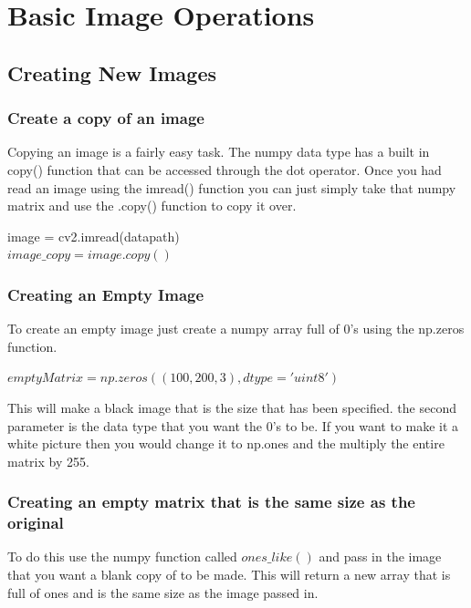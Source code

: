 \documentclass[fleqn]{article}
\begin{document}
      \newpage

      \section{Basic Image Operations}

      \subsection{Creating New Images}
      \subsubsection{Create a copy of an image}
      Copying an image is a fairly easy task. The numpy data type has a built in copy() function that can be accessed through the dot operator. Once you had read an image using the imread() function you can just simply take that numpy matrix and use the .copy() function to copy it over.

      \begin{center}
        image = cv2.imread(datapath)\\
        $image\_copy = image.copy()$
      \end{center}

      \subsubsection{Creating an Empty Image}
      To create an empty image just create a numpy array full of 0's using the np.zeros function.

      \begin{center}
        $emptyMatrix = np.zeros((100,200,3),dtype='uint8')$\\
      \end{center}
              This will make a black image that is the size that has been specified. the second parameter is the data type that you want the 0's to be. If you want to make it a white picture then you would change it to np.ones and the multiply the entire matrix by 255.

      \subsubsection{Creating an empty matrix that is the same size as the original}
      To do this use the numpy function called $ones\_like()$ and pass in the image that you want a blank copy of to be made. This will return a new array that is full of ones and is the same size as the image passed in.
\end{document}
